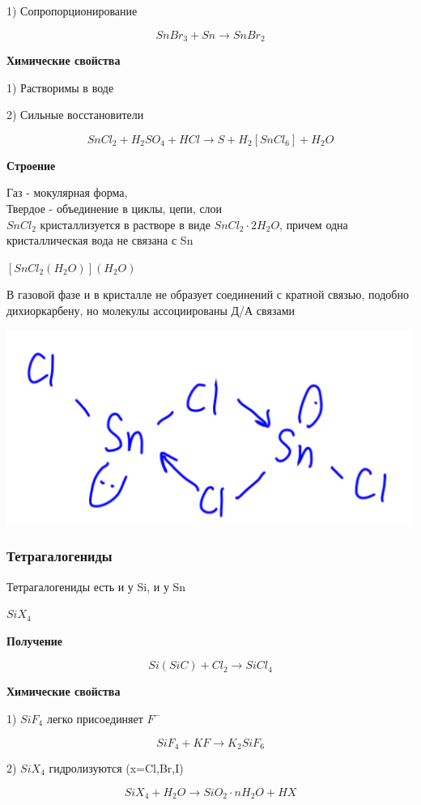 \documentclass[14pt,a4paper]{scrartcl}
\begin{document}
1) Сопропорционирование

$$SnBr_3 + Sn \rightarrow SnBr_2$$

\textbf{Химические свойства}

1) Растворимы в воде

2) Сильные восстановители

$$SnCl_2 + H_2SO_4 + HCl \rightarrow S + H_2[SnCl_6] + H_2O$$

\textbf{Строение}

Газ - мокулярная форма,\\
Твердое - объединение в циклы, цепи, слои\\

$SnCl_2$ кристаллизуется в растворе в виде $SnCl_2\cdot 2H_2O$, причем одна кристаллическая вода не связана с Sn
 
$[SnCl_2(H_2O)](H_2O)$

В газовой фазе и в кристалле не образует соединений с кратной связью, подобно дихиоркарбену, но молекулы ассоциированы Д/А связами

\includegraphics{10v2.png}

\subsubsection{Тетрагалогениды}

Тетрагалогениды есть и у Si, и у Sn

$SiX_4$

\textbf{Получение}

$$Si (SiC) + Cl_2 \rightarrow SiCl_4$$

\textbf{Химические свойства}

1) $SiF_4$ легко присоединяет $F^-$

$$SiF_4 + KF \rightarrow K_2SiF_6$$

2) $SiX_4$ гидролизуются (x=Cl,Br,I)

$$SiX_4 + H_2O \rightarrow SiO_2\cdot nH_2O + HX$$
\end{document}
